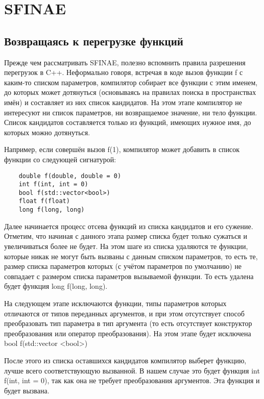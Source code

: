\section{SFINAE}

\subsection{Возвращаясь к перегрузке функций}

	Прежде чем рассматривать SFINAE, полезно вспомнить правила разрешения перегрузок в C++. Неформально говоря, встречая в коде вызов функции f с каким-то списком параметров, компилятор собирает все функции с этим именем, до которых может дотянуться (основываясь на правилах поиска в пространствах имён) и составляет из них список кандидатов. На этом этапе компилятор не интересуют ни список параметров, ни возвращаемое значение, ни тело функции. Список кандидатов составляется только из функций, имеющих нужное имя, до которых можно дотянуться.
	
	Например, если совершён вызов f(1), компилятор может добавить в список функции со следующей сигнатурой:
	
	\begin{verbatim}
	double f(double, double = 0)
	int f(int, int = 0)
	bool f(std::vector<bool>)
	float f(float)
	long f(long, long)
	\end{verbatim}
	
	Далее начинается процесс отсева функций из списка кандидатов и его сужение. Отметим, что начиная с данного этапа размер списка будет только сужаться и увеличиваться более не будет. На этом шаге из списка удаляются те функции, которые никак не могут быть вызваны с данным списком параметров, то есть те, размер списка параметров которых (с учётом параметров по умолчанию) не совпадает с размером списка параметров вызываемой функции. То есть удалена будет функция long f(long, long).
	
	На следующем этапе исключаются функции, типы параметров которых отличаются от типов переданных аргументов, и при этом отсутствует способ преобразовать тип параметра в тип аргумента (то есть отсутствует конструктор преобразования или оператор преобразования). На этом этапе будет исключена 
bool f(std::vector <bool>)
	
	После этого из списка оставшихся кандидатов компилятор выберет функцию, лучше всего соответствующую вызванной. В нашем случае это будет функция 
int f(int, int = 0), так как она не требует преобразования аргументов. Эта функция и будет вызвана. 

